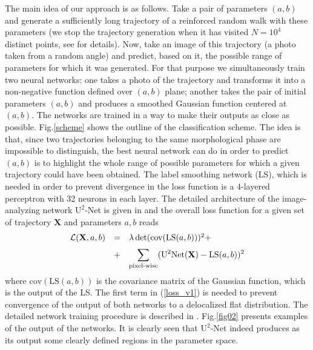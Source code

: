 \documentclass[aps,a4paper,twocolumn,showpacs]{revtex4}
\newcommand{\eq}[1]{(\ref{#1})}
\newcommand{\fig}[1]{Fig.\ref{#1}}
\newcommand{\be}{\begin{equation}}
\newcommand{\ee}{\end{equation}}
\newcommand{\ve}{\mathbf}
\begin{document}
The main idea of our approach is as follows. Take a pair of parameters $(a,b)$ and generate a sufficiently long trajectory of a reinforced random walk with these parameters (we stop the trajectory generation when it has visited $N = 10^4$ distinct points, see \cite{supp} for details). Now, take an image of this trajectory (a photo taken from a random angle) and predict, based on it, the possible range of parameters for which it was generated. For that purpose we simultaneously train two neural networks: one takes a photo of the trajectory and transforms it into a non-negative function defined over $(a,b)$ plane; another takes the pair of initial parameters $(a,b)$ and produces a smoothed Gaussian function centered at $(a,b)$. The networks are trained in a way to make their outputs as close as possible. \fig{scheme} shows the outline of the classification scheme. The idea is that, since two trajectories belonging to the same morphological phase are impossible to distinguish, the best neural network can do in order to predict $(a,b)$ is to highlight the whole range of possible parameters for which a given trajectory could have been obtained. The label smoothing network (LS), which is needed in order to prevent divergence in the loss function is a 4-layered perceptron with 32 neurons in each layer. The detailed architecture of the image-analyzing network $\text{U}^{2}$-Net is given in \cite{supp} and the overall loss function for a given set of trajectory $\ve X$ and parameters $a,b$ reads
\be
\begin{array}{rll}
\mathcal{L}(\ve X, a,b) & = & \lambda \det(\text{cov}(\text{LS}(a,b)))^{2} + \medskip \\
& + & \displaystyle \sum_{\text{pixel-wise}} (\text{U}^{2}\text{Net}(\ve X)- \text{LS}(a,b))^{2}
\end{array}
\label{loss_v1}
\ee
where $\text{cov}(\text{LS}(a,b))$ is the covariance matrix of the Gaussian function, which is the output of the LS. The first term in \eq{loss_v1} is needed to prevent convergence of the output of both networks to a delocalized flat distribution. The detailed network training procedure is described in \cite{supp}. \fig{fig02} presents examples of the output of the networks. It is clearly seen that $\text{U}^{2}$-Net indeed produces as its output some clearly defined regions in the parameter space. 
\end{document}
